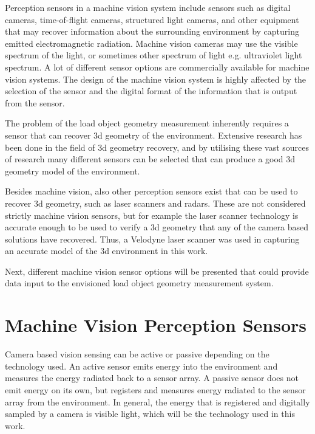 \documentclass[12pt,a4paper,oneside,pdftex]{report}
\begin{document}
Perception sensors in a machine vision system include sensors such as digital cameras, time-of-flight cameras, structured light cameras, and other equipment that may recover information about the surrounding environment by capturing emitted electromagnetic radiation. Machine vision cameras may use the visible spectrum of the light, or sometimes other spectrum of light e.g. ultraviolet light spectrum. A lot of different sensor options are commercially available for machine vision systems. The design of the machine vision system is highly affected by the selection of the sensor and the digital format of the information that is output from the sensor.

The problem of the load object geometry measurement inherently requires a sensor that can recover 3d geometry of the environment. Extensive research has been done in the field of 3d geometry recovery, and by utilising these vast sources of research many different sensors can be selected that can produce a good 3d geometry model of the environment.

Besides machine vision, also other perception sensors exist that can be used to recover 3d geometry, such as laser scanners and radars. These are not considered strictly machine vision sensors, but for example the laser scanner technology is accurate enough to be used to verify a 3d geometry that any of the camera based solutions have recovered. Thus, a Velodyne laser scanner was used in capturing an accurate model of the 3d environment in this work.

Next, different machine vision sensor options will be presented that could provide data input to the envisioned load object geometry measurement system.

\section{Machine Vision Perception Sensors}
\label{section:perception_sensors}

Camera based vision sensing can be active or passive depending on the technology used. An active sensor emits energy into the environment and measures the energy radiated back to a sensor array. A passive sensor does not emit energy on its own, but registers and measures energy radiated to the sensor array from the environment. In general, the energy that is registered and digitally sampled by a camera is visible light, which will be the technology used in this work.
\end{document}
